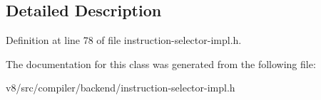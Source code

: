 \subsection{Detailed Description}


Definition at line 78 of file instruction-\/selector-\/impl.\+h.



The documentation for this class was generated from the following file\+:\begin{DoxyCompactItemize}
\item 
v8/src/compiler/backend/instruction-\/selector-\/impl.\+h\end{DoxyCompactItemize}

